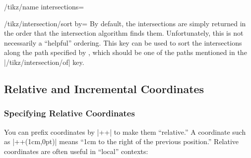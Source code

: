 \begin{key}{/tikz/name intersections=}
  \begin{key}{/tikz/intersection/sort by=}
By default, the intersections are simply returned in the order that
the intersection algorithm finds them. Unfortunately, this is not
necessarily a ``helpful'' ordering. This key can be used to sort
the intersections along the path specified by ,
which should be one of the paths mentioned in the
|/tikz/intersection/of| key.

\begin{codeexample}[]
\end{codeexample}

  \end{key}
\end{key}




\subsection{Relative and Incremental Coordinates}


\subsubsection{Specifying Relative Coordinates}

You can prefix coordinates by |++| to make them ``relative.'' A
coordinate such as |++(1cm,0pt)| means ``1cm to the right of the
previous position.'' Relative coordinates are often useful in
``local'' contexts:

\begin{codeexample}[]
\end{codeexample}


